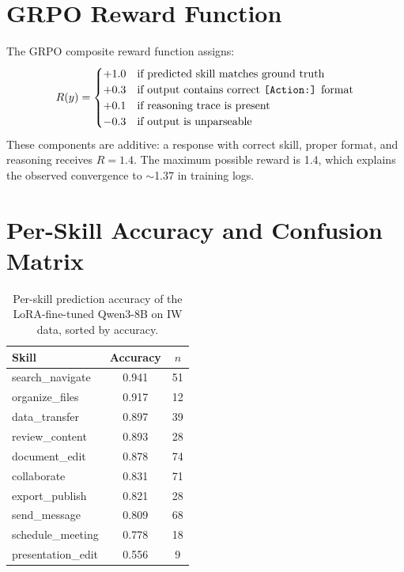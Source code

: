 \documentclass{article}
\begin{document}
\section{GRPO Reward Function}
\label{app:grpo_reward}

The GRPO composite reward function assigns:
\begin{equation}
R(y) = \begin{cases}
+1.0 & \text{if predicted skill matches ground truth} \\
+0.3 & \text{if output contains correct \texttt{[Action:]} format} \\
+0.1 & \text{if reasoning trace is present} \\
-0.3 & \text{if output is unparseable}
\end{cases}
\end{equation}
These components are additive: a response with correct skill, proper format, and reasoning receives $R = 1.4$. The maximum possible reward is 1.4, which explains the observed convergence to $\sim$1.37 in training logs.

\section{Per-Skill Accuracy and Confusion Matrix}
\label{app:perskill}

\begin{table}[h]
\centering
\caption{Per-skill prediction accuracy of the LoRA-fine-tuned Qwen3-8B on IW data, sorted by accuracy.}
\label{tab:perskill}
\small
\begin{tabular}{lcc}
\toprule
\textbf{Skill} & \textbf{Accuracy} & \textbf{$n$} \\
\midrule
search\_navigate & 0.941 & 51 \\
organize\_files & 0.917 & 12 \\
data\_transfer & 0.897 & 39 \\
review\_content & 0.893 & 28 \\
document\_edit & 0.878 & 74 \\
collaborate & 0.831 & 71 \\
export\_publish & 0.821 & 28 \\
send\_message & 0.809 & 68 \\
schedule\_meeting & 0.778 & 18 \\
presentation\_edit & 0.556 & 9 \\
\bottomrule
\end{tabular}
\end{table}
\end{document}
